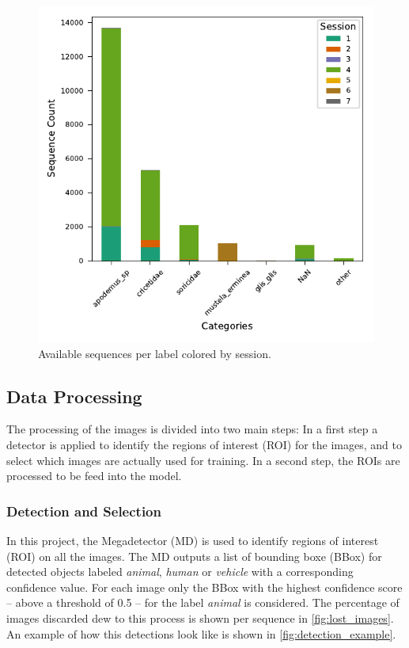     

    \begin{figure}[ht]
    \centering
    \includegraphics{figures/label2_session.pdf}
    \caption{Available sequences per label colored by session.}
    \label{fig:sequenceperlabel}
    \end{figure}

    \subsection{Data Processing}

    The processing of the images is divided into two main steps: 
    In a first step a detector is applied to identify the regions of interest (ROI) for the images, and to select which images are actually used for training.
    In a second step, the ROIs are processed to be feed into the model.

        \subsubsection{Detection and Selection}
        
        In this project, the Megadetector (MD) \autocite{morrisEfficientPipelineCamera2025} is used to identify regions of interest (ROI) on all the images.
        The MD outputs a list of bounding boxe (BBox) for detected objects labeled \textit{animal}, \textit{human} or \textit{vehicle} with a corresponding confidence value.
        For each image only the BBox with the highest confidence score -- above a threshold of 0.5 -- for the label \textit{animal} is considered.
        The percentage of images discarded dew to this process is  shown per sequence in \autoref{fig:lost_images}.
        An example of how this detections look like is shown in \autoref{fig:detection_example}.

